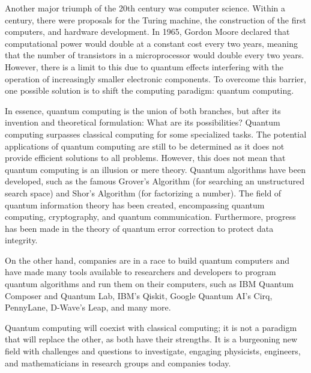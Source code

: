 Another major triumph of the 20th century was computer science. Within a century, there were proposals for the Turing machine, the construction of the first computers, and hardware development. In 1965, Gordon Moore declared that computational power would double at a constant cost every two years, meaning that the number of transistors in a microprocessor would double every two years. However, there is a limit to this due to quantum effects interfering with the operation of increasingly smaller electronic components. To overcome this barrier, one possible solution is to shift the computing paradigm: quantum computing.

In essence, quantum computing is the union of both branches, but after its invention and theoretical formulation: What are its possibilities? Quantum computing surpasses classical computing for some specialized tasks. The potential applications of quantum computing are still to be determined as it does not provide efficient solutions to all problems. However, this does not mean that quantum computing is an illusion or mere theory. Quantum algorithms have been developed, such as the famous Grover's Algorithm (for searching an unstructured search space) and Shor's Algorithm (for factorizing a number). The field of quantum information theory has been created, encompassing quantum computing, cryptography, and quantum communication. Furthermore, progress has been made in the theory of quantum error correction to protect data integrity.

On the other hand, companies are in a race to build quantum computers and have made many tools available to researchers and developers to program quantum algorithms and run them on their computers, such as IBM Quantum Composer and Quantum Lab, IBM's Qiskit, Google Quantum AI's Cirq, PennyLane, D-Wave's Leap, and many more.

Quantum computing will coexist with classical computing; it is not a paradigm that will replace the other, as both have their strengths. It is a burgeoning new field with challenges and questions to investigate, engaging physicists, engineers, and mathematicians in research groups and companies today.

\endinput
